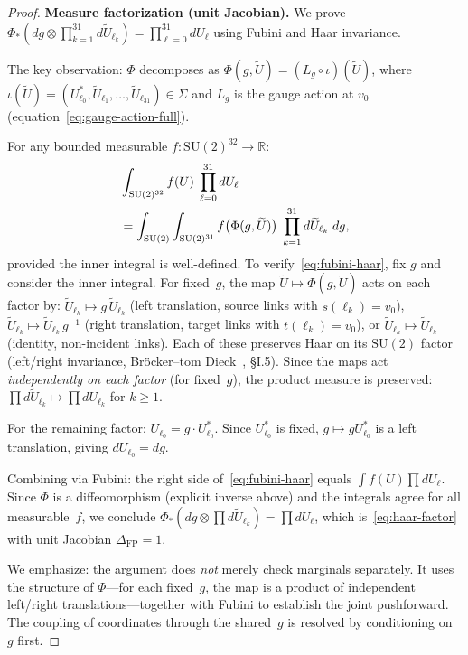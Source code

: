 \documentclass[11pt]{article}
\theoremstyle{definition}
\newcommand{\SU}{\mathrm{SU}}
\newcommand{\R}{\mathbb{R}}
\begin{document}
\begin{proof}
\textbf{Measure factorization (unit Jacobian).}
We prove $\Phi_*(dg\otimes\prod_{k=1}^{31}d\widetilde{U}_{\ell_k})
=\prod_{\ell=0}^{31}dU_\ell$ using Fubini and Haar invariance.

The key observation: $\Phi$ decomposes as
$\Phi(g,\widetilde{U})=(L_g\circ\iota)(\widetilde{U})$, where
$\iota(\widetilde{U})=(U_{\ell_0}^*,\widetilde{U}_{\ell_1},\ldots,
\widetilde{U}_{\ell_{31}})\in\Sigma$ and $L_g$ is the gauge action
at $v_0$ (equation~\eqref{eq:gauge-action-full}).

For any bounded measurable $f:\SU(2)^{32}\to\R$:
\begin{align}
&\int_{\SU(2)^{32}} f(U)\;\prod_{\ell=0}^{31}dU_\ell \notag\\
&= \int_{\SU(2)}\int_{\SU(2)^{31}}
f\bigl(\Phi(g,\widetilde{U})\bigr)\;
\prod_{k=1}^{31}d\widetilde{U}_{\ell_k}\;dg,
\label{eq:fubini-haar}
\end{align}
provided the inner integral is well-defined.
To verify~\eqref{eq:fubini-haar}, fix $g$ and consider the inner
integral.  For fixed~$g$, the map $\widetilde{U}\mapsto\Phi(g,\widetilde{U})$
acts on each factor by:
$\widetilde{U}_{\ell_k}\mapsto g\,\widetilde{U}_{\ell_k}$
(left translation, source links with $s(\ell_k)=v_0$),
$\widetilde{U}_{\ell_k}\mapsto\widetilde{U}_{\ell_k}\,g^{-1}$
(right translation, target links with $t(\ell_k)=v_0$), or
$\widetilde{U}_{\ell_k}\mapsto\widetilde{U}_{\ell_k}$ (identity,
non-incident links).  Each of these preserves Haar on its
$\SU(2)$ factor (left/right invariance,
Bröcker--tom Dieck~\cite{BtD}, \S I.5).  Since the maps act
\emph{independently on each factor} (for fixed~$g$), the product
measure is preserved:
$\prod d\widetilde{U}_{\ell_k}\mapsto\prod dU_{\ell_k}$
for $k\ge 1$.

For the remaining factor: $U_{\ell_0}=g\cdot U_{\ell_0}^*$.
Since $U_{\ell_0}^*$ is fixed, $g\mapsto gU_{\ell_0}^*$ is a left
translation, giving $dU_{\ell_0}=dg$.

Combining via Fubini: the right side of~\eqref{eq:fubini-haar}
equals $\int f(U)\prod dU_\ell$.  Since $\Phi$ is a
diffeomorphism (explicit inverse above) and the integrals agree
for all measurable~$f$, we conclude
$\Phi_*(dg\otimes\prod d\widetilde{U}_{\ell_k})
=\prod dU_\ell$,
which is~\eqref{eq:haar-factor} with unit Jacobian $\Delta_{\mathrm{FP}}=1$.

We emphasize: the argument does \emph{not} merely check marginals
separately.  It uses the structure of $\Phi$---for each fixed~$g$,
the map is a product of independent left/right translations---together
with Fubini to establish the joint pushforward.  The coupling of
coordinates through the shared~$g$ is resolved by conditioning
on~$g$ first.


\end{proof}
\end{document}
